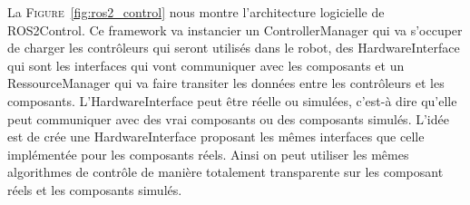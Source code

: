         La \textsc{Figure}~\ref{fig:ros2_control} nous montre l'architecture logicielle de \gls{ROS2Control}. Ce framework va instancier un \gls{ControllerManager} qui va s'occuper de charger les contrôleurs qui seront utilisés dans le robot, des \gls{HardwareInterface} qui sont les interfaces qui vont communiquer avec les composants et un \gls{RessourceManager} qui va faire transiter les données entre les contrôleurs et les composants. L'\gls{HardwareInterface} peut être réelle ou simulées, c'est-à dire qu'elle peut communiquer avec des vrai composants ou des composants simulés. L'idée est de crée une \gls{HardwareInterface} proposant les mêmes interfaces que celle implémentée pour les composants réels. Ainsi on peut utiliser les mêmes algorithmes de contrôle de manière totalement transparente sur les composant réels et les composants simulés.
